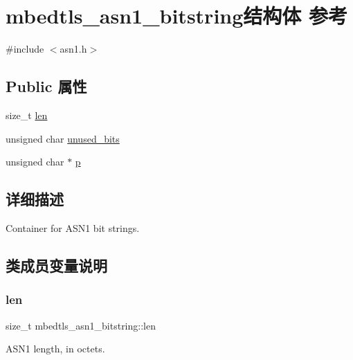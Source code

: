 \hypertarget{structmbedtls__asn1__bitstring}{}\section{mbedtls\+\_\+asn1\+\_\+bitstring结构体 参考}
\label{structmbedtls__asn1__bitstring}


{\ttfamily \#include $<$asn1.\+h$>$}

\subsection*{Public 属性}
\begin{DoxyCompactItemize}
\item 
size\+\_\+t \hyperlink{structmbedtls__asn1__bitstring_a943b4155650f680f3906ca9be0e66f80}{len}
\item 
unsigned char \hyperlink{structmbedtls__asn1__bitstring_aca26541c9ecb384ef2d5c2ca6a05a25b}{unused\+\_\+bits}
\item 
unsigned char $\ast$ \hyperlink{structmbedtls__asn1__bitstring_af09328f8b1a8cb5bf4afae369ce3629c}{p}
\end{DoxyCompactItemize}


\subsection{详细描述}
Container for A\+S\+N1 bit strings. 

\subsection{类成员变量说明}
\mbox{\label{structmbedtls__asn1__bitstring_a943b4155650f680f3906ca9be0e66f80}} 
\subsubsection{\texorpdfstring{len}{len}}
{\footnotesize\ttfamily size\+\_\+t mbedtls\+\_\+asn1\+\_\+bitstring\+::len}

A\+S\+N1 length, in octets. \mbox{\label{structmbedtls__asn1__bitstring_af09328f8b1a8cb5bf4afae369ce3629c}} 
